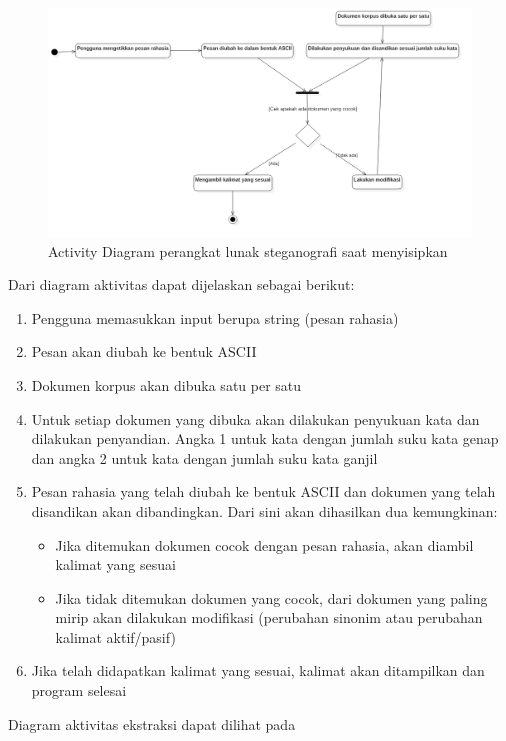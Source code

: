 \begin{figure}[H]
	\centering
	\includegraphics[scale=0.5]{Gambar/activity-penyisipan}
	\caption{Activity Diagram perangkat lunak steganografi saat menyisipkan} 
	\label{fig:4_activity-penyisipan}
\end{figure}

Dari diagram aktivitas dapat dijelaskan sebagai berikut:

\begin{enumerate}
	\item Pengguna memasukkan input berupa string (pesan rahasia)
	\item Pesan akan diubah ke bentuk ASCII
	\item Dokumen korpus akan dibuka satu per satu
	\item Untuk setiap dokumen yang dibuka akan dilakukan penyukuan kata dan dilakukan penyandian. Angka 1 untuk kata dengan jumlah suku kata genap dan angka 2 untuk kata dengan jumlah suku kata ganjil
	\item Pesan rahasia yang telah diubah ke bentuk ASCII dan dokumen yang telah disandikan akan dibandingkan. Dari sini akan dihasilkan dua kemungkinan:
	\begin{itemize}
		\item Jika ditemukan dokumen cocok dengan pesan rahasia, akan diambil kalimat yang sesuai
		\item Jika tidak ditemukan dokumen yang cocok, dari dokumen yang paling mirip akan dilakukan modifikasi (perubahan sinonim atau perubahan kalimat aktif/pasif)
	\end{itemize}
	\item Jika telah didapatkan kalimat yang sesuai, kalimat akan ditampilkan dan program selesai
\end{enumerate}

Diagram aktivitas ekstraksi dapat dilihat pada 

